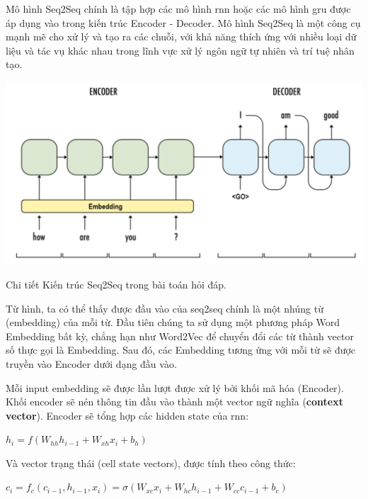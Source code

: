 \documentclass[a4paper, 12pt, openany]{book}
\begin{document}
Mô hình Seq2Seq chính là tập hợp các mô hình \ac{rnn} hoặc các mô hình \ac{gru} được áp dụng vào trong kiến trúc Encoder - Decoder. Mô hình Seq2Seq 
là một công cụ mạnh mẽ cho xử lý và tạo ra các chuỗi, với khả năng thích ứng với nhiều loại dữ liệu và tác vụ khác nhau trong lĩnh vực xử lý ngôn ngữ tự nhiên và trí tuệ nhân tạo.

\begin{minipage}{\linewidth}
    \captionsetup{type=figure}
    \centering
    \includegraphics[width=\linewidth]{./assets/images/seq2seq2.png}
    \caption{Chi tiết Kiến trúc Seq2Seq trong bài toán hỏi đáp.\cite{sutskever2014sequence}}
\end{minipage}
\vspace{0.5cm}

Từ hình, ta có thể thấy được đầu vào của \ac{seq2seq} chính là một nhúng từ (embedding) của mỗi từ.
Đầu tiên chúng ta sử dụng
một phương pháp Word Embedding bất kỳ, chẳng hạn như Word2Vec để chuyển
đổi các từ thành vector số thực gọi là Embedding. Sau đó, các Embedding tương ứng với
mỗi từ sẽ được truyền vào Encoder dưới dạng đầu vào.

Mỗi input embedding sẽ được lần lượt được xử lý bởi khối mã hóa (Encoder).
Khối encoder sẽ nén thông tin đầu vào thành một vector ngữ nghĩa (\textbf{context vector}). Encoder sẽ tổng hợp các hidden state của \ac{rnn}:

\begin{center}
    \(h_i = f(W_{hh}h_{i-1} + W_{xh}x_i + b_h)\)
\end{center}

Và vector trạng thái (cell state vectors), được tính theo công thức: 

\begin{center}
    \(c_i = f_c(c_{i-1}, h_{i-1}, x_i) = \sigma(W_{xc}x_i + W_{hc}h_{i-1} + W_{cc}c_{i-1} + b_c)\)
\end{center}
\end{document}
